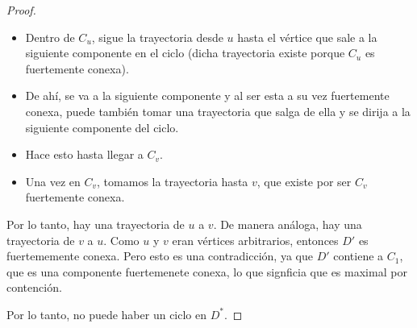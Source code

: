 \documentclass{article}
\begin{document}
\begin{enumerate}
\begin{proof}
      \begin{itemize}
      \item Dentro de $C_u$, sigue la trayectoria desde $u$
        hasta el vértice que sale a la siguiente componente en el
        ciclo (dicha trayectoria existe porque $C_u$ es
        fuertemente conexa).
      \item De ahí, se va a la siguiente componente y al ser
        esta a su vez fuertemente conexa, puede también tomar una
        trayectoria que salga de ella y se dirija a la siguiente
        componente del ciclo.
      \item Hace esto hasta llegar a $C_v$.
      \item Una vez en $C_v$, tomamos la trayectoria hasta $v$,
        que existe por ser $C_v$ fuertemente conexa.
      \end{itemize}

      Por lo tanto, hay una trayectoria de $u$ a $v$. De manera
      análoga, hay una trayectoria de $v$ a $u$. Como $u$ y $v$
      eran vértices arbitrarios, entonces $D'$ es fuertememente
      conexa. Pero esto es una contradicción, ya que $D'$
      contiene a $C_1$, que es una componente fuertemenete
      conexa, lo que signficia que es maximal por contención.

      Por lo tanto, no puede haber un ciclo en $D^\ast$.
      
      
    \end{proof}

  \end{enumerate}
\end{document}
